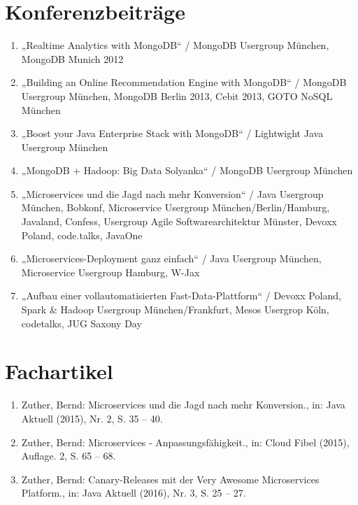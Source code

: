 \section*{Konferenzbeiträge}
\begin{enumerate}[label=,leftmargin=0cm,itemsep=10pt]
\item „Realtime Analytics with MongoDB“ / MongoDB Usergroup München, MongoDB Munich 2012
\item „Building an Online Recommendation Engine with MongoDB“ / MongoDB Usergroup München, MongoDB Berlin 2013, Cebit 2013, GOTO NoSQL München
\item „Boost your Java Enterprise Stack with MongoDB“ / Lightwight Java Usergroup München
\item „MongoDB + Hadoop: Big Data Solyanka“ / MongoDB Usergroup München
\item „Microservices und die Jagd nach mehr Konversion“ / Java Usergroup München, Bobkonf, Microservice  Usergroup München/Berlin/Hamburg, Javaland, Confess, Usergroup Agile Softwarearchitektur Münster, Devoxx Poland, code.talks, JavaOne
\item „Microservices-Deployment ganz einfach“ / Java Usergroup München, Microservice  Usergroup Hamburg, W-Jax
\item „Aufbau einer vollautomatisierten Fast-Data-Plattform“ / Devoxx Poland, Spark \& Hadoop Usergroup München/Frankfurt, Mesos Usergrop Köln, codetalks, JUG Saxony Day
\end{enumerate}

\section*{Fachartikel}
\begin{enumerate}[label=,leftmargin=0cm,itemsep=10pt]
\item Zuther, Bernd: Microservices und die Jagd nach mehr Konversion., in: Java Aktuell (2015), Nr. 2, S. 35 – 40.
\item Zuther, Bernd: Microservices - Anpassungsfähigkeit., in: Cloud Fibel (2015), Auflage. 2, S. 65 – 68.
\item Zuther, Bernd: Canary-Releases mit der Very Awesome Microservices Platform., in: Java Aktuell (2016), Nr. 3, S. 25 – 27.
\end{enumerate}